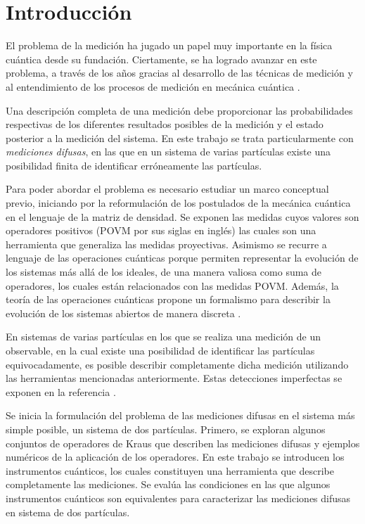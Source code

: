 \chapter*{Introducción}

El problema de la medición ha jugado un papel muy importante en la física cuántica desde su fundación. Ciertamente, se ha logrado avanzar en este problema, a través de los años gracias al desarrollo de las técnicas de medición y al entendimiento de los procesos de medición en mecánica cuántica {\cite{Pineda_2021}}. 

 Una descripción completa de una medición debe proporcionar las probabilidades respectivas de los diferentes resultados posibles de la medición y el estado posterior a la medición del sistema. En este trabajo se trata particularmente con \textit{mediciones difusas}, en las que en un sistema de varias partículas existe una posibilidad finita de identificar erróneamente las partículas.


Para poder abordar el problema es necesario estudiar un marco conceptual previo, iniciando por la reformulación de los postulados de la mecánica cuántica en el lenguaje de la matriz de densidad. Se exponen las medidas cuyos valores son operadores positivos (POVM por sus siglas en inglés) las cuales son una herramienta que generaliza las medidas proyectivas. Asimismo se recurre a lenguaje de las operaciones cuánticas porque permiten representar la evolución de los sistemas más allá de los ideales, de una manera valiosa como suma de operadores, los cuales están relacionados con las medidas
POVM\@. Además, la teoría de las operaciones cuánticas propone un formalismo para describir la evolución de los sistemas abiertos de manera discreta {\cite{nielsen_chuang_2010}}.

En sistemas de varias partículas en los que se realiza una
medición de un observable, en la cual existe una posibilidad de identificar las partículas equivocadamente, es posible describir completamente dicha medición utilizando las herramientas mencionadas anteriormente. Estas detecciones imperfectas se exponen en la referencia {\cite{Pineda_2021}}.

Se inicia la formulación del problema de las mediciones difusas en el sistema más simple posible, un sistema de dos partículas. Primero, se exploran algunos conjuntos de operadores de Kraus que describen las mediciones difusas y ejemplos numéricos de la aplicación de los operadores. En este trabajo se introducen los instrumentos cuánticos, los cuales constituyen una herramienta que describe completamente las mediciones. Se evalúa las condiciones en las que algunos instrumentos cuánticos son equivalentes para caracterizar las mediciones difusas en sistema de dos partículas.

